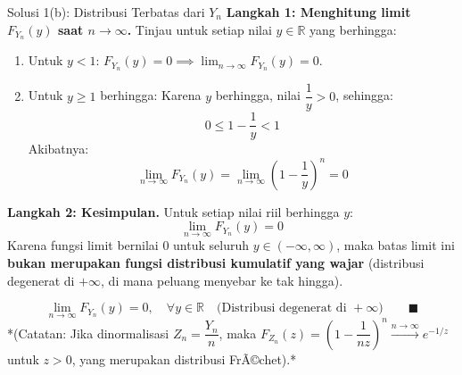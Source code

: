 \documentclass[10pt,twoside]{article}
\begin{document}
\begin{solbox}{Solusi 1(b): Distribusi Terbatas dari $Y_n$}
\textbf{Langkah 1: Menghitung limit $F_{Y_n}(y)$ saat $n \to \infty$.}
Tinjau untuk setiap nilai $y \in \mathbb{R}$ yang berhingga:
\begin{enumerate}[label=\arabic*.]
  \item Untuk $y < 1$: $F_{Y_n}(y) = 0 \implies \lim_{n \to \infty} F_{Y_n}(y) = 0$.
  \item Untuk $y \ge 1$ berhingga: Karena $y$ berhingga, nilai $\dfrac{1}{y} > 0$, sehingga:
  \[
  0 \le 1 - \frac{1}{y} < 1
  \]
  Akibatnya:
  \[
  \lim_{n \to \infty} F_{Y_n}(y) = \lim_{n \to \infty} \left(1 - \frac{1}{y}\right)^n = 0
  \]
\end{enumerate}

\textbf{Langkah 2: Kesimpulan.}
Untuk setiap nilai riil berhingga $y$:
\[
\lim_{n \to \infty} F_{Y_n}(y) = 0
\]
Karena fungsi limit bernilai 0 untuk seluruh $y \in (-\infty, \infty)$, maka batas limit ini \textbf{bukan merupakan fungsi distribusi kumulatif yang wajar} (distribusi degenerat di $+\infty$, di mana peluang menyebar ke tak hingga).

\[
\boxed{\lim_{n \to \infty} F_{Y_n}(y) = 0, \quad \forall y \in \mathbb{R} \quad \text{(Distribusi degenerat di }+\infty\text{)}} \qquad \blacksquare
\]
*(Catatan: Jika dinormalisasi $Z_n = \dfrac{Y_n}{n}$, maka $F_{Z_n}(z) = \left(1 - \dfrac{1}{nz}\right)^n \xrightarrow{n \to \infty} e^{-1/z}$ untuk $z > 0$, yang merupakan distribusi FrÃ©chet).*
\end{solbox}
\end{document}
